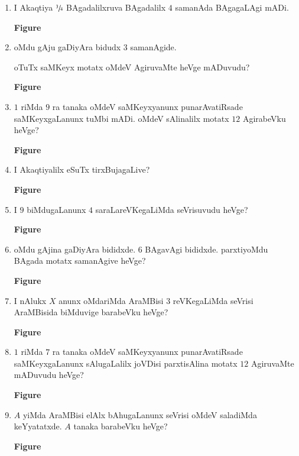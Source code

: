 \begin{enumerate}
\item I Akaqtiya $\sfrac{3}{4}$ BAgadalilxruva BAgadalilx $4$ samanAda BAgagaLAgi mADi.
\begin{center}
{\rm\bfseries Figure}
\end{center}

\item oMdu gAju gaDiyAra bidudx $3$ samanAgide.

oTuTx saMKeyx motatx oMdeV AgiruvaMte heVge mADuvudu?
\begin{center}
{\rm\bfseries Figure}
\end{center}

\item $1$ riMda $9$ ra tanaka oMdeV saMKeyxyanunx punarAvatiRsade saMKeyxgaLanunx tuMbi mADi. oMdeV sAlinalilx motatx $12$ AgirabeVku heVge?
\begin{center}
{\rm\bfseries Figure}
\end{center}

\item I Akaqtiyalilx eSuTx tirxBujagaLive?
\begin{center}
{\rm\bfseries Figure}
\end{center}

\item I $9$ biMdugaLanunx $4$ saraLareVKegaLiMda seVrisuvudu heVge?
\begin{center}
{\rm\bfseries Figure}
\end{center}

\item oMdu gAjina gaDiyAra bididxde. $6$ BAgavAgi bididxde. parxtiyoMdu BAgada motatx samanAgive heVge?
\begin{center}
{\rm\bfseries Figure}
\end{center}

\item I nAlukx $X$ anunx oMdariMda AraMBisi $3$ reVKegaLiMda seVrisi AraMBisida biMduvige barabeVku heVge?
\begin{center}
{\rm\bfseries Figure}
\end{center}

\item $1$ riMda $7$ ra tanaka oMdeV saMKeyxyanunx punarAvatiRsade saMKeyxgaLanunx sAlugaLalilx joVDisi parxtisAlina motatx $12$ AgiruvaMte mADuvudu heVge?
\begin{center}
{\rm\bfseries Figure}
\end{center}

\item $A$ yiMda AraMBisi elAlx bAhugaLanunx seVrisi oMdeV saladiMda keYyatatxde. $A$ tanaka barabeVku heVge?
\begin{center}
{\rm\bfseries Figure}
\end{center}


\end{enumerate}
